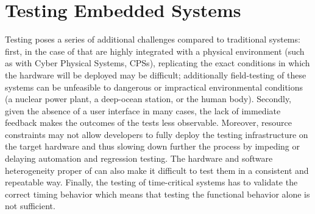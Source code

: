 \section{Testing Embedded Systems}
Testing \ess poses a series of additional challenges compared to traditional systems: first, in the case of \ess that are highly integrated with a physical environment (such as with Cyber Physical Systems, CPSs), replicating the exact conditions in which the hardware will be deployed may be difficult; additionally field-testing of these systems can be unfeasible to dangerous or impractical environmental conditions (\eg a nuclear power plant, a deep-ocean station, or the human body). Secondly, given the absence of a user interface in many cases, the lack of immediate feedback makes the outcomes of the tests less observable. Moreover, resource constraints may not allow developers to fully deploy the testing infrastructure on the target hardware and thus slowing down further the process by impeding or delaying automation and regression testing. The hardware and software heterogeneity proper of \ess can also make it difficult to test them in a consistent and repeatable way. Finally, the testing of time-critical systems has to validate the correct timing behavior which means that testing the functional behavior alone is not sufficient.


